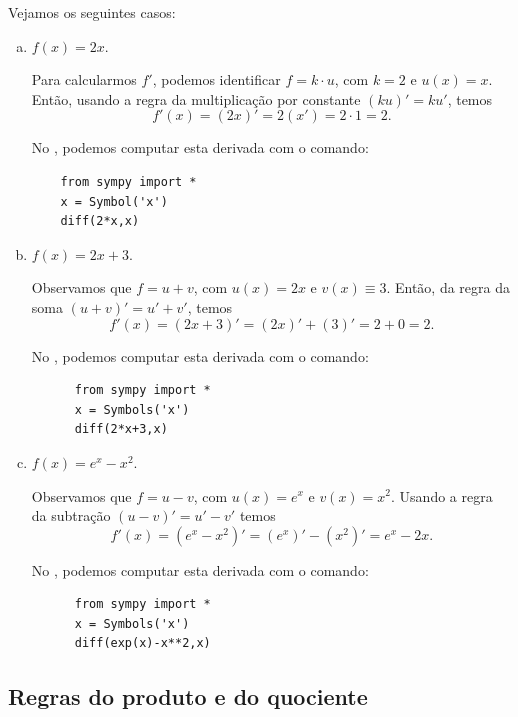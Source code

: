\begin{ex}
  Vejamos os seguintes casos:
  \begin{enumerate}[a)]
  \item $f(x) = 2x$.

    Para calcularmos $f'$, podemos identificar $f = k\cdot u$, com $k=2$ e $u(x) = x$. Então, usando a regra da multiplicação por constante $(ku)' = ku'$, temos
    \begin{equation}
      f'(x) = (2x)' = 2(x') = 2\cdot 1 = 2.
    \end{equation}

  \ifispython
  No \sympy, podemos computar esta derivada com o comando:
  \begin{lstlisting}
    from sympy import *
    x = Symbol('x')
    diff(2*x,x)
  \end{lstlisting}
  \fi
    

  \item $f(x) = 2x + 3$.

    Observamos que $f = u + v$, com $u(x) = 2x$ e $v(x)\equiv 3$. Então, da regra da soma $(u+v)' = u' + v'$, temos
    \begin{equation}
      f'(x) = (2x + 3)' = (2x)' + (3)' = 2 + 0 = 2.
    \end{equation}

    \ifispython
    No \sympy, podemos computar esta derivada com o comando:
    \begin{lstlisting}
      from sympy import *
      x = Symbols('x')
      diff(2*x+3,x)
    \end{lstlisting}
    \fi

  \item $f(x) = e^x - x^2$.

    Observamos que $f = u-v$, com $u(x) = e^x$ e $v(x)= x^2$. Usando a regra da subtração $(u-v)' = u' - v'$ temos
    \begin{equation}
      f'(x) = (e^x - x^2)' = (e^x)' - (x^2)' = e^x - 2x.
    \end{equation}

    \ifispython
    No \sympy, podemos computar esta derivada com o comando:
    \begin{lstlisting}
      from sympy import *
      x = Symbols('x')
      diff(exp(x)-x**2,x)
    \end{lstlisting}
    \fi
  \end{enumerate}
\end{ex}

\subsection{Regras do produto e do quociente}

